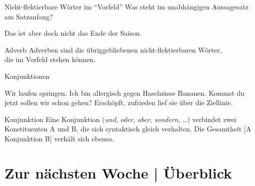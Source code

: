 \begin{frame}
  {Nicht-flektierbare Wörter im "`Vorfeld"'}
  \pause
  Was steht im unabhängigen Aussagesatz am Satzanfang?\\
  \pause
  {}
  \pause
  \begin{exe}
    \ex\label{ex:adverbenadkopulasundpartikeln038}
    \begin{xlist}
      \pause
      \pause
      \pause
      \pause
      \pause
      \pause
      \pause
      \pause
      \pause
      \pause
    \end{xlist}
    \ex\label{ex:adverbenadkopulasundpartikeln044} Das ist aber \alert{doch} nicht das Ende der Saison.
  \end{exe}
  \pause
  \Viertelzeile
  \begin{block}{Adverb}
    Adverben sind die übriggebliebenen nicht-flektierbaren Wörter,\\
    die im Vorfeld stehen können.
  \end{block}
\end{frame}


\begin{frame}
  {Konjunktionen}
  \onslide<+->
  \onslide<+->
  \begin{exe}
    \ex
    \begin{xlist}
      \ex Wir \alert{laufen}  \alert{springen}.
      \ex Ich bin allergisch gegen \alert{Haselnüsse}  \alert{Bananen}.
      \ex \alert{Kommst du jetzt}  \alert{sollen wir schon gehen}?
      \ex \alert{Erschöpft},  \alert{zufrieden} lief sie über die Ziellinie.
    \end{xlist}
  \end{exe}
  \Zeile
  \onslide<+->
  \begin{block}{Kunjunktion}
    Eine Konjunktion (\textit{und}, \textit{oder}, \textit{aber}, \textit{sondern}, \ldots) verbindet zwei Konstituenten A und B, die sich syntaktisch gleich verhalten. Die Gesamtheit [A Konjunktion B] verhält sich ebenso.
  \end{block}
\end{frame}


\section{Zur nächsten Woche | Überblick}

